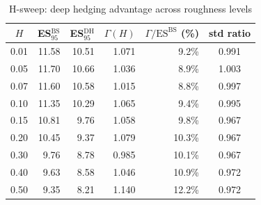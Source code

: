 \begin{table}[h]
\centering
\caption{H-sweep: deep hedging advantage across roughness levels}
\begin{tabular}{c|rrrrc}
\hline
$H$ & ES$_{95}^{\text{BS}}$ & ES$_{95}^{\text{DH}}$ & $\Gamma(H)$ & $\Gamma/\text{ES}^{\text{BS}}$ (\%) & std ratio \\
\hline
0.01 & 11.58 & 10.51 & 1.071 & 9.2\% & 0.991 \\
0.05 & 11.70 & 10.66 & 1.036 & 8.9\% & 1.003 \\
0.07 & 11.60 & 10.58 & 1.015 & 8.8\% & 0.997 \\
0.10 & 11.35 & 10.29 & 1.065 & 9.4\% & 0.995 \\
0.15 & 10.81 & 9.76 & 1.058 & 9.8\% & 0.967 \\
0.20 & 10.45 & 9.37 & 1.079 & 10.3\% & 0.967 \\
0.30 & 9.76 & 8.78 & 0.985 & 10.1\% & 0.967 \\
0.40 & 9.63 & 8.58 & 1.046 & 10.9\% & 0.972 \\
0.50 & 9.35 & 8.21 & 1.140 & 12.2\% & 0.972 \\
\hline
\end{tabular}
\end{table}